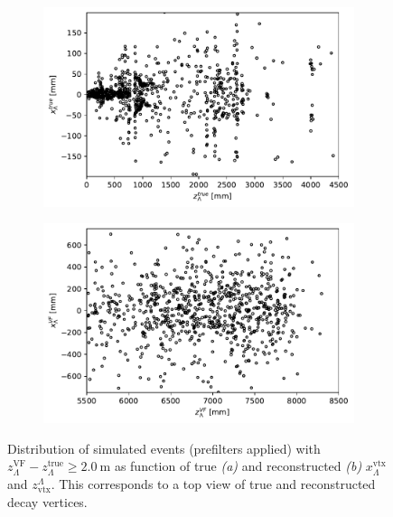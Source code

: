 \begin{figure}[t]
	\centering
	\begin{subfigure}{.45\textwidth}
		\includegraphics[width=\textwidth]{graphics/04-event_selection/bump_Lambda_true_endvertex_z_vs_x.pdf}
		\caption{}
	\end{subfigure}
	\begin{subfigure}{.45\textwidth}
		\includegraphics[width=\textwidth]{graphics/04-event_selection/bump_scatter_Lambda_endvertex_z_vs_x.pdf}
		\caption{}
	\end{subfigure}
	\caption{Distribution of simulated \demonstratorshort events (prefilters applied) with $z_\Lambda^\text{VF} - z_\Lambda^\text{true} \geq \SI{2.0}{\meter}$ as function of true \textit{(a)} and reconstructed \textit{(b)} $x_\Lambda^\text{vtx}$ and $z_\text{vtx}^\Lambda$. This corresponds to a top view of true and reconstructed \lz decay vertices.}
\end{figure}

